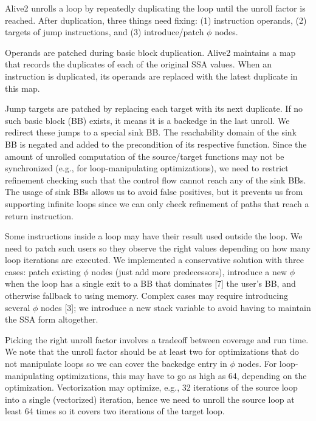 Alive2 unrolls a loop by repeatedly duplicating the loop until the
unroll factor is reached. After duplication, three things need fixing:
(1) instruction operands, (2) targets of jump instructions, and (3)
introduce/patch $\phi$ nodes.

Operands are patched during basic block duplication. Alive2 maintains
a map that records the duplicates of each of the original SSA values.
When an instruction is duplicated, its operands are replaced with the
latest duplicate in this map.

Jump targets are patched by replacing each target with its next
duplicate. If no such basic block (BB) exists, it means it is a
backedge in the last unroll. We redirect these jumps to a special sink
BB. The reachability domain of the sink BB is negated and added to the
precondition of its respective function. Since the amount of unrolled
computation of the source/target functions may not be synchronized
(e.g., for loop-manipulating optimizations), we need to restrict
refinement checking such that the control flow cannot reach any of the
sink BBs. The usage of sink BBs allows us to avoid false positives,
but it prevents us from supporting infinite loops since we can only
check refinement of paths that reach a return instruction.

Some instructions inside a loop may have their result used outside the
loop. We need to patch such users so they observe the right values
depending on how many loop iterations are executed. We implemented a
conservative solution with three cases: patch existing $\phi$ nodes
(just add more predecessors), introduce a new $\phi$ when the loop has
a single exit to a BB that dominates [7] the user’s BB, and otherwise
fallback to using memory. Complex cases may require introducing
several $\phi$ nodes [3]; we introduce a new stack variable to avoid
having to maintain the SSA form altogether.


Picking the right unroll factor involves a tradeoff between coverage
and run time. We note that the unroll factor should be at least two
for optimizations that do not manipulate loops so we can cover the
backedge entry in $\phi$ nodes. For loop-manipulating optimizations,
this may have to go as high as 64, depending on the optimization.
Vectorization may optimize, e.g., 32 iterations of the source loop
into a single (vectorized) iteration, hence we need to unroll the
source loop at least 64 times so it covers two iterations of the
target loop.
